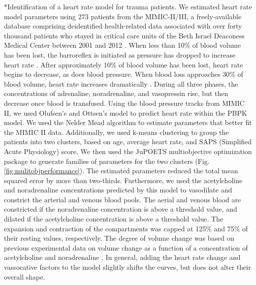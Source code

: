 \documentclass[11pt]{article}
\makeatletter
\renewcommand\paragraph{\@startsection
  {paragraph}{2}{0mm}
  {-0.05in}
  {-0.5\baselineskip}
  {\normalfont\normalsize\itshape}}
\makeatother
\begin{document}
\paragraph*{Identification of a heart rate model for trauma patients.}
We estimated heart rate model parameters using 273 patients from the MIMIC-II/III, a freely-available database comprising deidentified health-related data associated with
over forty thousand patients who stayed in critical care units of the Beth Israel Deaconess Medical Center between 2001 and 2012 \cite{Johnson:2016aa}.
When less than 10\% of blood volume has been lost, the barroreflex is initiated as pressure has dropped to increase heart rate \cite{foex1999systemic}.
After approximately 10\% of blood volume has been lost, heart rate begins to decrease, as does blood pressure.
When blood loss approaches 30\% of blood volume, heart rate increases dramatically \cite{jacobsen1990cardiovascular}.
During all three phases, the concentrations of adrenaline, noradrenaline, and vasopressin rise, but then decrease once blood is transfused.
Using the blood pressure tracks from MIMIC II, we used Olufsen's and Ottsen's model \cite{olufsen2013practical} to predict heart rate within the PBPK model.
We used the Nelder Mead algorithm to estimate parameters that better fit the MIMIC II data.
Additionally, we used k-means clustering to group the patients into two clusters, based on age, average heart rate, and SAPS (Simplified Acute Physiology) score.
We then used the JuPOETS multiobjective optimization package \cite{bassen2016jupoets} to generate families of parameters for the two clusters (Fig. \ref{fig:mulitobjperformance}).
The estimated parameters reduced the total mean squared error by more than two-thirds. Furthermore, we used the acetylcholine and noradrenaline concentrations predicted by this model to vasodilate and constrict the arterial and venous blood pools. The aerial and venous blood are constricted if the noradrenaline concentration is above a threshold value, and dilated if the acetylcholine concentration is above a threshold value. The expansion and contraction of the compartments was capped at 125\% and 75\% of their resting values, respectively. The degree of volume change was based on previous experimental data on volume change as a function of a concentration of acetylcholine and noradrenaline \cite{chowienczyk1994blood,dora1983effect}.
In general, adding the heart rate change and vassocative factors to the model slightly shifts the curves, but does not alter their overall shape.
\end{document}
